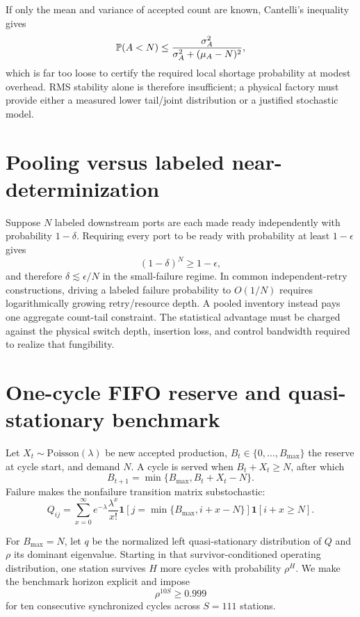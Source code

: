\documentclass[aps,prx,preprint,superscriptaddress,nofootinbib,longbibliography]{revtex4-2}
\begin{document}
If only the mean and variance of accepted count are known, Cantelli's inequality gives
\begin{equation}
\mathbb P(A<N)\le\frac{\sigma_A^2}{\sigma_A^2+(\mu_A-N)^2},
\end{equation}
which is far too loose to certify the required local shortage probability at modest overhead. RMS stability alone is therefore insufficient; a physical factory must provide either a measured lower tail/joint distribution or a justified stochastic model.

\section{Pooling versus labeled near-determinization}
Suppose $N$ labeled downstream ports are each made ready independently with probability $1-\delta$. Requiring every port to be ready with probability at least $1-\epsilon$ gives
\begin{equation}
(1-\delta)^N\ge1-\epsilon,
\end{equation}
and therefore $\delta\lesssim\epsilon/N$ in the small-failure regime. In common independent-retry constructions, driving a labeled failure probability to $O(1/N)$ requires logarithmically growing retry/resource depth. A pooled inventory instead pays one aggregate count-tail constraint. The statistical advantage must be charged against the physical switch depth, insertion loss, and control bandwidth required to realize that fungibility.

\section{One-cycle FIFO reserve and quasi-stationary benchmark}
Let $X_t\sim\mathrm{Poisson}(\lambda)$ be new accepted production, $B_t\in\{0,\ldots,B_{\max}\}$ the reserve at cycle start, and demand $N$. A cycle is served when $B_t+X_t\ge N$, after which
\begin{equation}
B_{t+1}=\min\{B_{\max},B_t+X_t-N\}.
\end{equation}
Failure makes the nonfailure transition matrix substochastic:
\begin{equation}
Q_{ij}=\sum_{x=0}^{\infty}e^{-\lambda}\frac{\lambda^x}{x!}
\mathbf 1\!\left[j=\min\{B_{\max},i+x-N\}\right]
\mathbf 1[i+x\ge N].
\end{equation}

For $B_{\max}=N$, let $q$ be the normalized left quasi-stationary distribution of $Q$ and $\rho$ its dominant eigenvalue. Starting in that survivor-conditioned operating distribution, one station survives $H$ more cycles with probability $\rho^H$. We make the benchmark horizon explicit and impose
\begin{equation}
\rho^{10S}\ge0.999
\end{equation}
for ten consecutive synchronized cycles across $S=111$ stations.
\end{document}
